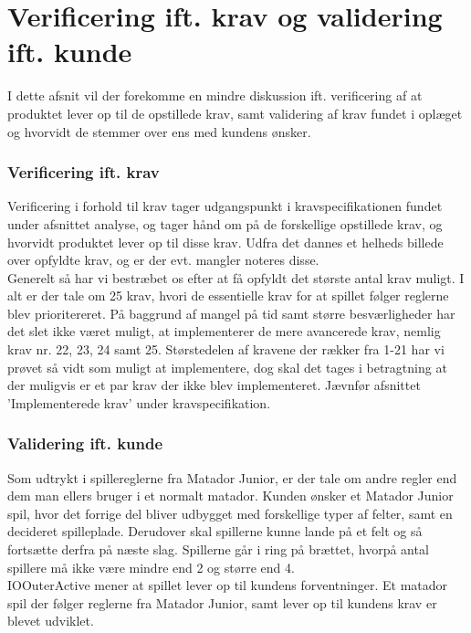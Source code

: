 \section{Verificering ift. krav og validering ift. kunde}
I dette afsnit vil der forekomme en mindre diskussion ift. verificering af at produktet lever op til de opstillede krav, samt validering af krav fundet i oplæget og hvorvidt de stemmer over ens med kundens ønsker.\\

\subsubsection{Verificering ift. krav}
Verificering i forhold til krav tager udgangspunkt i kravspecifikationen fundet under afsnittet analyse, og tager hånd om på de forskellige opstillede krav, og hvorvidt produktet lever op til disse krav. Udfra det dannes et helheds billede over opfyldte krav, og er der evt. mangler noteres disse.\\
Generelt så har vi bestræbet os efter at få opfyldt det største antal krav muligt. I alt er der tale om 25 krav, hvori de essentielle krav for at spillet følger reglerne blev prioritereret. På baggrund af mangel på tid samt større besværligheder har det slet ikke været muligt, at implementerer de mere avancerede krav, nemlig krav nr. 22, 23, 24 samt 25. Størstedelen af kravene der rækker fra 1-21 har vi prøvet så vidt som muligt at implementere, dog skal det tages i betragtning at der muligvis er et par krav der ikke blev implementeret. Jævnfør afsnittet 'Implementerede krav' under kravspecifikation.\\

\subsubsection{Validering ift. kunde}
Som udtrykt i spillereglerne fra Matador Junior, er der tale om andre regler end dem man ellers bruger i et normalt matador. Kunden ønsker et Matador Junior spil, hvor det forrige del bliver udbygget med forskellige typer af felter, samt en decideret spilleplade. Derudover skal spillerne kunne lande på et felt og så fortsætte derfra på næste slag. Spillerne går i ring på brættet, hvorpå antal spillere må ikke være mindre end 2 og større end 4.
\\
IOOuterActive mener at spillet lever op til kundens forventninger. Et matador spil der følger reglerne fra Matador Junior, samt lever op til kundens krav er blevet udviklet.\\

\pagebreak